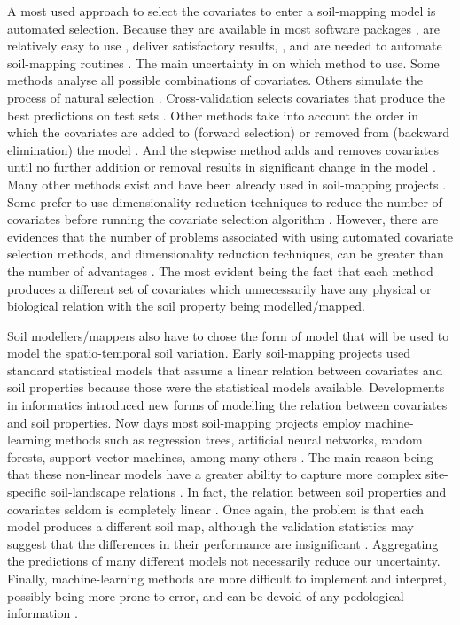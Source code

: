 A most used approach to select the covariates to enter a soil-mapping model is automated selection.
Because they are available in most software packages \citep{Harrell2001}, are relatively easy to
use \citep{DraperEtAl1971}, deliver satisfactory results, \citep{HenglEtAl2004}, and are needed
to automate soil-mapping routines \citep{HenglEtAl2014}. The main uncertainty in on which method to 
use. Some methods analyse all possible combinations of covariates. Others simulate the process of 
natural selection \citep{AndersenEtAl2010}. Cross-validation selects covariates that produce the 
best predictions on test sets \citep{GuyonEtAl2003}. Other methods take into account the order in 
which the covariates are added to (forward selection) or removed from (backward elimination) the model 
\citep{LarkEtAl2007a}. And the stepwise method adds and removes covariates until no further addition
or removal results in significant change in the model \citep{Efroymson1962}. Many other methods 
exist and have been already used in soil-mapping projects \citep{PoggioEtAl2013, NussbaumEtAl2014}.
Some prefer to use dimensionality reduction techniques to reduce the number of covariates 
\citep{Massy1965} before running the covariate selection algorithm \citep{tenCatenEtAl2011a,
HenglEtAl2014}. However, there are evidences that the number of problems associated with using 
automated covariate selection methods, and dimensionality reduction techniques, can be greater than 
the number of advantages \citep{FarrarEtAl1967, Jackson1993, Chatfield1995, Edirisooriya1995, 
Harrell2001, Jolliffe2002, PeresNetoEtAl2005, LarkEtAl2007a}. The most evident being the fact that 
each method produces a different set of covariates which unnecessarily have any physical or
biological relation with the soil property being modelled/mapped.
 
Soil modellers/mappers also have to chose the form of model that will be used to model the 
spatio-temporal soil variation. Early soil-mapping projects used standard statistical models
that assume a linear relation between covariates and soil properties \citep{MooreEtAl1993, 
OdehEtAl1994} because those were the statistical models available. Developments in informatics 
introduced new forms of modelling the relation between covariates and soil properties. Now days 
most soil-mapping projects employ machine-learning methods such as regression trees, artificial 
neural networks, random forests, support vector machines, among many others \citep{HeungEtAl2016}.
The main reason being that these non-linear models have a greater ability to capture more complex 
site-specific soil-landscape relations \citep{Grunwald2009}. In fact, the relation between soil 
properties and covariates seldom is completely linear \citep{McKenzieEtAl2000}. Once again, the 
problem is that each model produces a different soil map, although the validation statistics may
suggest that the differences in their performance are insignificant \citep{HeungEtAl2016}. 
Aggregating the predictions of many different models not necessarily reduce our uncertainty. 
Finally, machine-learning methods are more difficult to implement and interpret, possibly being
more prone to error, and can be devoid of any pedological information \citep{Grunwald2009}.

